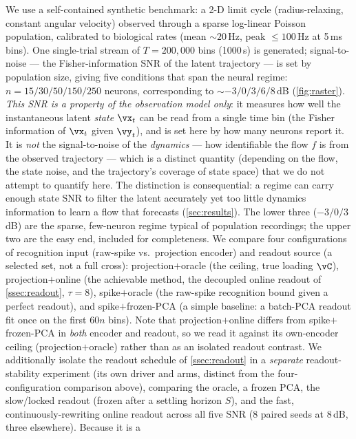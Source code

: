 \documentclass[11pt]{article}
\begin{document}
We use a self-contained synthetic benchmark: a 2-D limit cycle (radius-relaxing, constant angular
velocity) observed through a sparse log-linear Poisson population, calibrated to biological rates
(mean $\sim20$\,Hz, peak $\le100$\,Hz at 5\,ms bins). One single-trial stream of $T=200{,}000$
bins (1000\,s) is generated; signal-to-noise --- the Fisher-information SNR of the latent
trajectory \autocite{Jeon2024b} --- is set by population size, giving five conditions that span
the neural regime: $n=15/30/50/150/250$ neurons, corresponding to $\sim-3/0/3/6/8$\,dB
(\cref{fig:raster}). \emph{This SNR is a property of the observation model only}: it measures how
well the instantaneous latent \emph{state} $\vx_t$ can be read from a single time bin (the Fisher
information of $\vx_t$ given $\vy_t$), and is set here by how many neurons report it. It is
\emph{not} the signal-to-noise of the \emph{dynamics} --- how identifiable the flow $f$ is from the
observed trajectory --- which is a distinct quantity (depending on the flow, the state noise, and
the trajectory's coverage of state space) that we do not attempt to quantify here. The distinction
is consequential: a regime can carry enough state SNR to filter the latent accurately yet too
little dynamics information to learn a flow that forecasts (\cref{sec:results}). The lower three ($-3/0/3$\,dB) are the sparse, few-neuron regime typical of
population recordings; the upper two are the easy end, included for completeness. We compare four
configurations of recognition input (raw-spike vs.\ projection encoder) and readout source (a selected
set, not a full cross): projection$+$oracle (the ceiling, true loading $\vC$), projection$+$online
(the achievable method, the decoupled online readout of \cref{ssec:readout}, $\tau{=}8$),
spike$+$oracle (the raw-spike recognition bound given a perfect readout), and spike$+$frozen-PCA (a
simple baseline: a batch-PCA readout fit once on the first $60n$ bins). Note that
projection$+$online differs from spike$+$frozen-PCA in \emph{both} encoder and readout, so we read
it against its own-encoder ceiling (projection$+$oracle) rather than as an isolated readout
contrast. We additionally isolate the readout schedule of
\cref{ssec:readout} in a \emph{separate} readout-stability experiment (its own driver and arms,
distinct from the four-configuration comparison above), comparing the oracle, a frozen PCA, the
slow/locked readout (frozen after a settling horizon $S$), and the fast, continuously-rewriting
online readout across all five SNR ($8$ paired seeds at $8$\,dB, three elsewhere). Because it is a
\end{document}
